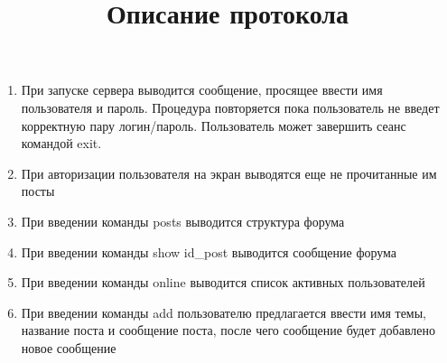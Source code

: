 \documentclass[10pt,a4paper]{report}
\begin{document}
\title{Описание протокола}
\begin{enumerate}
\item При запуске сервера выводится сообщение, просящее ввести имя пользователя и пароль. Процедура повторяется пока пользователь не введет корректную пару логин/пароль. Пользователь может завершить сеанс командой exit.
\item При авторизации пользователя на экран выводятся еще не прочитанные им посты
\item При введении команды posts выводится структура форума
\item При введении команды show id_post выводится сообщение форума
\item При введении команды online выводится список активных пользователей
\item При введении команды add пользователю предлагается ввести имя темы, название поста и сообщение поста, после чего сообщение будет добавлено новое сообщение
\end{enumerate}
\end{document}
